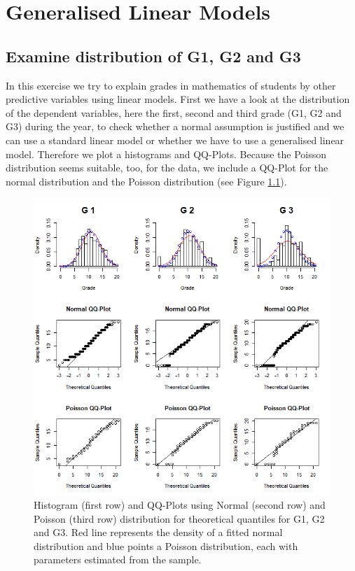 \chapter{Generalised Linear Models}
\section{Examine distribution of G1, G2 and G3}
In this exercise we try to explain grades in mathematics of students by other predictive variables using linear models. First we have a look at the distribution of the dependent variables, here the first, second and third grade (G1, G2 and G3) during the year, to check whether a normal assumption is justified and we can use a standard linear model or whether we have to use a generalised linear model. Therefore we plot a histograms and QQ-Plots. Because the Poisson distribution seems suitable, too, for the data, we include a QQ-Plot for the normal distribution and the Poisson distribution (see Figure \ref{4gradedist}). 
\begin{figure}[ptb]
\centering
\includegraphics[width=\textwidth, keepaspectratio]{ex7/gradedist.png}
\caption{Histogram (first row) and QQ-Plots using Normal (second row) and Poisson (third row) distribution for theoretical quantiles for G1, G2 and G3. Red line represents the density of a fitted normal distribution and blue points a Poisson distribution, each with parameters estimated from the sample.}
\label{4gradedist}
\end{figure} 

